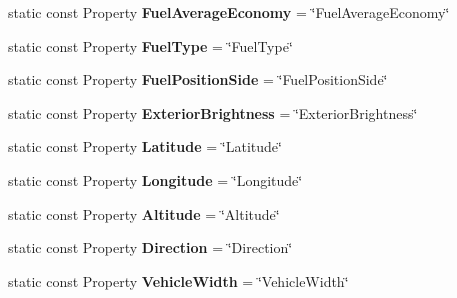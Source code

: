 \begin{DoxyCompactItemize}
\item 
\hypertarget{classVehicleProperty_aa453a0e6b9edee8da30b1f5b9a32edeb}{static const Property {\bfseries Fuel\-Average\-Economy} = \char`\"{}Fuel\-Average\-Economy\char`\"{}}\label{classVehicleProperty_aa453a0e6b9edee8da30b1f5b9a32edeb}

\item 
\hypertarget{classVehicleProperty_a2df3b5ff14ec4a92fba65ad72be7d5b7}{static const Property {\bfseries Fuel\-Type} = \char`\"{}Fuel\-Type\char`\"{}}\label{classVehicleProperty_a2df3b5ff14ec4a92fba65ad72be7d5b7}

\item 
\hypertarget{classVehicleProperty_a574a971800258aa3d53126ec01e85477}{static const Property {\bfseries Fuel\-Position\-Side} = \char`\"{}Fuel\-Position\-Side\char`\"{}}\label{classVehicleProperty_a574a971800258aa3d53126ec01e85477}

\item 
\hypertarget{classVehicleProperty_a490658c5e633ab54a5bbf11b5f38e994}{static const Property {\bfseries Exterior\-Brightness} = \char`\"{}Exterior\-Brightness\char`\"{}}\label{classVehicleProperty_a490658c5e633ab54a5bbf11b5f38e994}

\item 
\hypertarget{classVehicleProperty_a225bcbd3adba51c5d571a086a98f6b4f}{static const Property {\bfseries Latitude} = \char`\"{}Latitude\char`\"{}}\label{classVehicleProperty_a225bcbd3adba51c5d571a086a98f6b4f}

\item 
\hypertarget{classVehicleProperty_ac5565746cd2dfd2e3f8870d8e292b392}{static const Property {\bfseries Longitude} = \char`\"{}Longitude\char`\"{}}\label{classVehicleProperty_ac5565746cd2dfd2e3f8870d8e292b392}

\item 
\hypertarget{classVehicleProperty_a0411474f4450758ba2dbcdc136ef7391}{static const Property {\bfseries Altitude} = \char`\"{}Altitude\char`\"{}}\label{classVehicleProperty_a0411474f4450758ba2dbcdc136ef7391}

\item 
\hypertarget{classVehicleProperty_a89d7508f610bdbbeaaec742ee3d4f656}{static const Property {\bfseries Direction} = \char`\"{}Direction\char`\"{}}\label{classVehicleProperty_a89d7508f610bdbbeaaec742ee3d4f656}

\item 
\hypertarget{classVehicleProperty_a4e3c78c74cee15e4f0c8b5f1c11215e7}{static const Property {\bfseries Vehicle\-Width} = \char`\"{}Vehicle\-Width\char`\"{}}\label{classVehicleProperty_a4e3c78c74cee15e4f0c8b5f1c11215e7}


\end{DoxyCompactItemize}
